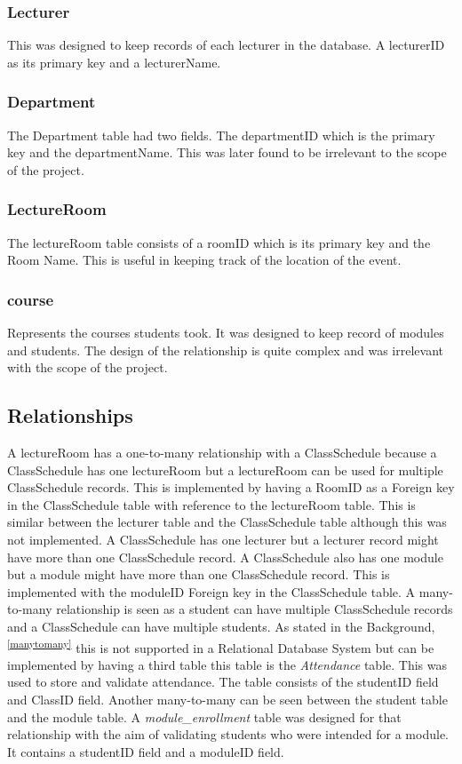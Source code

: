 \subsubsection*{Lecturer}
This was designed to keep records of each lecturer in the database. A lecturerID as its primary key and a lecturerName.
 
\subsubsection*{Department}
The Department table had two fields. The departmentID which is the primary key and the departmentName. This was later found to be irrelevant to the scope of the project.
 
\subsubsection*{LectureRoom}
The lectureRoom table consists of a roomID which is its primary key and the Room Name. This is useful in keeping track of the location of the event.
 
\subsubsection*{course}
Represents the courses students took. It was designed to keep record of modules and students. The design of the relationship is quite complex and was irrelevant with the scope of the project.
 
 
\subsection*{Relationships}
A lectureRoom has a one-to-many relationship with a ClassSchedule because a ClassSchedule has one lectureRoom but a lectureRoom can be used for multiple ClassSchedule records. This is implemented by having a RoomID as a Foreign key in the ClassSchedule table with reference to the lectureRoom table. This is similar between the lecturer table and the ClassSchedule table although this was not implemented. A ClassSchedule has one lecturer but a lecturer record might have more than one ClassSchedule record. A ClassSchedule also has one module but a module might have more than one ClassSchedule record. This is implemented with the moduleID Foreign key in the ClassSchedule table. A many-to-many relationship is seen as a student can have multiple ClassSchedule records and a ClassSchedule can have multiple students. As stated in the Background,\textsuperscript{\ref{manytomany}} this is not supported in a Relational Database System but can be implemented by having a third table this table is the \textit{Attendance} table. This was used to store and validate attendance. The table consists of the studentID field and ClassID field. Another many-to-many can be seen between the student table and the module table. A \textit{module\_enrollment} table was designed for that relationship with the aim of validating students who were intended for a module. It contains a studentID field and a moduleID field. 
 
